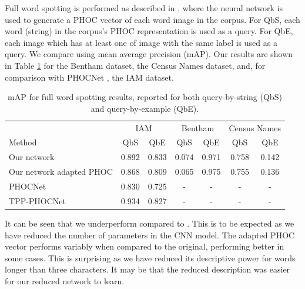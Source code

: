 \documentclass[ms,electronic,twosidetoc,letterpaper,chaptercenter,parttop,lof,lot]{byumsphd}
\begin{document}
Full word spotting is performed as described in \cite{sudholt2016}, where the neural network is used to generate a PHOC vector of each word image in the corpus. For QbS, each word (string) in the corpus's PHOC representation is used as a query. For QbE, each image which has at least one of image with the same label is used as a query. We compare using mean average precision (mAP). Our results are shown in Table \ref{tab:wordspottingresults} for the Bentham dataset, the Census Names dataset, and, for comparison with PHOCNet \cite{sudholt2016,sudholt2017}, the IAM dataset.

\begin{table}
\centering
\begin{tabular}{| l | c  c | c c | c c |}
  \hline
   & \multicolumn{2}{c|}{IAM} & \multicolumn{2}{c|}{Bentham} & \multicolumn{2}{c|}{Census Names}\\
  Method & QbS & QbE & QbS & QbE & QbS & QbE\\
  \hline		
  Our network  &  0.892 & 0.833  &  0.074 & 0.971  &  0.758 & 0.142  \\%
  Our network adapted PHOC  &  0.868 & 0.809  &  0.065 & 0.975  &  0.755 & 0.136 \\
  
  PHOCNet\cite{sudholt2016} & 0.830 & 0.725 & - & - & - & - \\
  TPP-PHOCNet\cite{sudholt2017} & 0.934 & 0.827 & - & - & - & - \\
  \hline  
\end{tabular}
\caption{mAP for full word spotting results, reported for both query-by-string (QbS) and query-by-example (QbE).}
\label{tab:wordspottingresults}
\end{table}

It can be seen that we underperform compared to \cite{sudholt2017}. This is to be expected as we have reduced the number of parameters in the  	CNN model. The adapted PHOC vector performs variably when compared to the original,  performing better in some cases. This is surprising as we have reduced its descriptive power for words longer than three characters. It may be that the reduced description was easier for our reduced network to learn.
\end{document}
